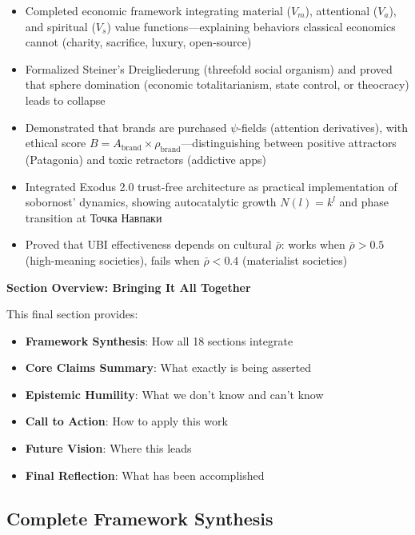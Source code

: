 \documentclass[11pt,a4paper]{article}
\theoremstyle{definition}
\theoremstyle{remark}
\begin{document}
\begin{small}
\begin{enumerate}
\begin{protocol}
\begin{itemize}
\item Completed economic framework integrating material (\(V_m\)), attentional (\(V_a\)), and spiritual (\(V_s\)) value functions—explaining behaviors classical economics cannot (charity, sacrifice, luxury, open-source)
\item Formalized Steiner's Dreigliederung (threefold social organism) and proved that sphere domination (economic totalitarianism, state control, or theocracy) leads to collapse
\item Demonstrated that brands are purchased \(\psi\)-fields (attention derivatives), with ethical score \(B = A_{\text{brand}} \times \rho_{\text{brand}}\)—distinguishing between positive attractors (Patagonia) and toxic retractors (addictive apps)
\item Integrated Exodus 2.0 trust-free architecture as practical implementation of sobornost' dynamics, showing autocatalytic growth \(N(l) = k^l\) and phase transition at Точка Навпаки
\item Proved that UBI effectiveness depends on cultural \(\bar{\rho}\): works when \(\bar{\rho} > 0.5\) (high-meaning societies), fails when \(\bar{\rho} < 0.4\) (materialist societies)
\end{itemize}


\begin{mdframed}[backgroundcolor=cyan!5,linewidth=2pt]
\textbf{Section Overview: Bringing It All Together}

This final section provides:

\begin{itemize}[nosep]
    \item \textbf{Framework Synthesis}: How all 18 sections integrate
    \item \textbf{Core Claims Summary}: What exactly is being asserted
    \item \textbf{Epistemic Humility}: What we don't know and can't know
    \item \textbf{Call to Action}: How to apply this work
    \item \textbf{Future Vision}: Where this leads
    \item \textbf{Final Reflection}: What has been accomplished
\end{itemize}
\end{mdframed}

\subsection{Complete Framework Synthesis}


\end{protocol}
\end{enumerate}
\end{small}
\end{document}

